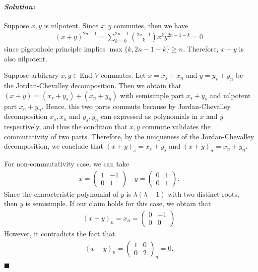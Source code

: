 \documentclass[12pt, a4paper]{article}
\newenvironment{solution}
  {\paragraph{\textit{Solution:}}\par\medskip}
  {\hfill$\blacksquare$\vspace{0.1cm}}
\begin{document}
\begin{solution}
Suppose $x,y$ is nilpotent. Since $x,y$ commutes, then we have 
\begin{align*}
  (x+y)^{2n-1} = \sum_{k=0}^{2n-1} \binom{2n-1}{k} x^ky^{2n-1-k} = 0
\end{align*}
since pigeonhole principle implies $\max\{k,2n-1-k\}\ge n$. Therefore, $x+y$ is also nilpotent.

Suppose arbitrary $x,y\in \text{End } V$ commutes. Let $x=x_s+x_n$ and $y=y_s+y_n$ be the Jordan-Chevalley decomposition. 
Then we obtain that $(x+y) = (x_s+y_s)+(x_n+y_n)$ with semisimple part $x_s+y_s$ and nilpotent part $x_n+y_n$.
Hence, this two parts commute because by Jordan-Chevalley decomposition $x_s,x_n$ and $y_s,y_n$ can expressed as polynomials in $x$ and $y$ respectively,
and thus the condition that $x,y$ commute validates the commutativity of two parts.
Therefore, by the uniqueness of the Jordan-Chevalley decomposition, we conclude that $(x+y)_s = x_s + y_s$ and $(x+y)_n = x_n + y_n$.

For non-commutativity case, we can take 
\begin{align*}
  x = 
  \begin{pmatrix}
1 & -1\\
0 & 1
\end{pmatrix} 
\quad 
  y = 
  \begin{pmatrix}
0 & 1 \\
0 & 1
\end{pmatrix}.
\end{align*}
Since the characteristic polynomial of $y$ is $\lambda(\lambda-1)$ with two distinct roots, then $y$ is semisimple.
If our claim holds for this case, we obtain that 
\begin{align*}
  (x+y)_n= x_n=\begin{pmatrix}
0 & -1 \\
0 & 0
\end{pmatrix} 
\end{align*}
However, it contradicts the fact that 
\begin{align*}
  (x+y)_n= 
  \begin{pmatrix}
1 & 0 \\
0 & 2
\end{pmatrix} _n = 0.
\end{align*}
\end{solution}
\end{document}
